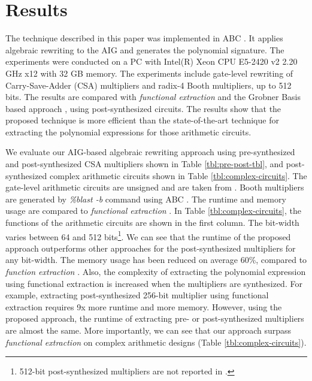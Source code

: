 \section{Results}

The technique described in this paper was implemented in ABC \cite{abc-link}. It applies algebraic rewriting to the AIG and generates the polynomial signature. The experiments were conducted on a PC with Intel(R) Xeon CPU E5-2420 v2 2.20 GHz x12 with 32 GB memory. The experiments include gate-level rewriting of Carry-Save-Adder (CSA) multipliers and {\color{red}radix-4 Booth multipliers}, up to 512 bits. The results are compared with \textit{functional extraction} \cite{ciesielski2015verification} and {\color{red}the Grobner Basis based approach \cite{sayedformal:date-2016}\cite{pruss2015TCAD:efficient}, using post-synthesized circuits.} 
The results show that the proposed technique is more efficient than the state-of-the-art technique for extracting the polynomial expressions for those arithmetic circuits. 

We evaluate our AIG-based algebraic rewriting approach using pre-synthesized and post-synthesized CSA multipliers shown in Table \ref{tbl:pre-post-tbl}, and post-synthesized complex arithmetic circuits shown in Table \ref{tbl:complex-circuits}. The gate-level arithmetic circuits are unsigned and are taken from \cite{ciesielski2015verification}. Booth multipliers are generated by \textit{\%blast -b} command using ABC \cite{abc-link}. The runtime and memory usage are compared to \textit{functional extraction} \cite{ciesielski2015verification}. In Table \ref{tbl:complex-circuits}, the functions of the arithmetic circuits are shown in the first column.
The bit-width varies between 64 and 512 bits\footnote{512-bit post-synthesized multipliers are not reported in \cite{ciesielski2015verification}.}. We can see that the runtime of the proposed approach outperforms other approaches for the post-synthesized multipliers for any bit-width. The memory usage has been reduced on average 60\%, compared to \textit{function extraction} \cite{ciesielski2015verification}. Also, the complexity of extracting the polynomial expression using functional extraction is increased when the multipliers are synthesized. For example, extracting post-synthesized 256-bit multiplier using functional extraction requires 9x more runtime and more memory. However, using the proposed approach, the runtime of extracting pre- or post-synthesized multipliers are almost the same. More importantly, we can see that our approach surpass \textit{functional extraction} on complex arithmetic designs (Table \ref{tbl:complex-circuits}).




%
%

%
